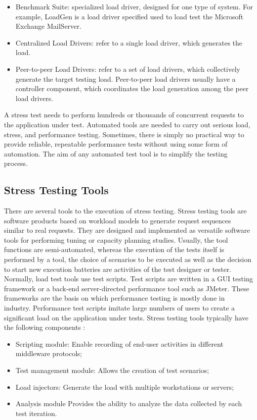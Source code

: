 \documentclass[espaco=umemeio,chapter=TITLE,twoside,openright]{abnt}
\begin{document}
\begin{itemize}
\item Benchmark Suite: specialized load driver, designed for one type of system. For example, LoadGen is a load driver specified used to load test the Microsoft Exchange MailServer.
\item  Centralized Load Drivers: refer to a single load driver, which generates the load.
\item Peer-to-peer Load Drivers: refer to a set of load drivers, which collectively generate the target testing load. Peer-to-peer load drivers usually have a controller component, which coordinates the load generation among the peer load drivers.
\end{itemize}

A stress test needs to perform hundreds or thousands of concurrent requests to the application under test. Automated tools are needed to carry out serious load, stress, and performance testing. Sometimes, there is simply no practical way to provide reliable, repeatable performance tests without using some form of automation. The aim of any automated test tool is to simplify the testing process.


\subsection{Stress Testing Tools}

There are several tools to the execution of stress testing. Stress testing tools are software products based on workload models to generate request sequences similar to real requests. They are designed and implemented as versatile software tools for performing tuning or capacity planning studies. Usually, the tool functions are semi-automated, whereas the execution of the tests itself is performed by a tool, the choice of scenarios to be executed as well as the decision to start new execution batteries are activities of the test designer or tester. Normally, load test tools use test scripts. Test scripts are written in a GUI testing framework or a back-end server-directed performance tool such as JMeter. These frameworks are the basis on which performance testing is mostly done in industry. Performance test scripts imitate large numbers of users to create a significant load on the application under tests. Stress testing tools typically have the following components \cite{Grechanik2012} \cite{Molyneaux2009}:

\begin{itemize}
\item Scripting module: Enable recording of end-user activities in different middleware protocols;
\item Test management module: Allows the creation of test scenarios;
\item Load injectors: Generate the load with multiple workstations or servers;
\item Analysis module Provides the ability to analyze the data collected by each test iteration.
\end{itemize}
\end{document}
